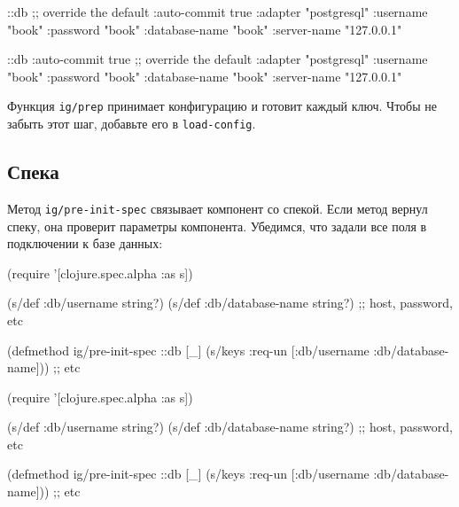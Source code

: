 \begin{english}
  \begin{clojure}
{::db {;; override the default
       :auto-commit   true
       :adapter       "postgresql"
       :username      "book"
       :password      "book"
       :database-name "book"
       :server-name   "127.0.0.1"}}
  \end{clojure}
\end{english}

\else

\begin{english}
  \begin{clojure}
{::db {:auto-commit   true ;; override the default
       :adapter       "postgresql"
       :username      "book"
       :password      "book"
       :database-name "book"
       :server-name   "127.0.0.1"}}
  \end{clojure}
\end{english}

\fi

Функция \verb|ig/prep| принимает конфигурацию и готовит каждый ключ. Чтобы не
забыть этот шаг, добавьте его в \verb|load-config|.

\subsection{Спека}


Метод \verb|ig/pre-init-spec| связывает компонент со спекой. Если метод вернул
спеку, она проверит параметры компонента. Убедимся, что задали все поля в
подключении к базе данных:

\ifx\DEVICETYPE\MOBILE

\begin{english}
  \begin{clojure}
(require '[clojure.spec.alpha :as s])

(s/def :db/username string?)
(s/def :db/database-name string?)
;; host, password, etc

(defmethod ig/pre-init-spec ::db [_]
  (s/keys :req-un [:db/username
                   :db/database-name]))
                   ;; etc
  \end{clojure}
\end{english}

\else

\begin{english}
  \begin{clojure}
(require '[clojure.spec.alpha :as s])

(s/def :db/username string?)
(s/def :db/database-name string?)
;; host, password, etc

(defmethod ig/pre-init-spec ::db [_]
  (s/keys :req-un [:db/username
                   :db/database-name])) ;; etc
  \end{clojure}
\end{english}

